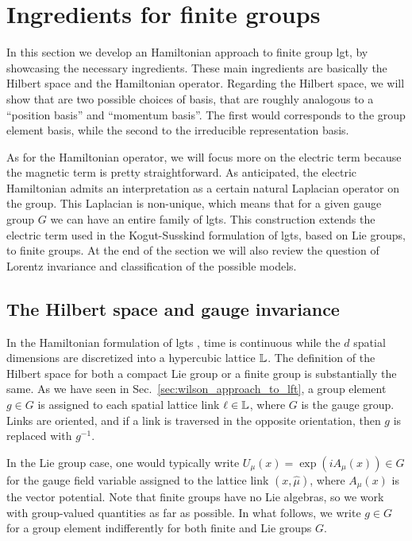 \section{Ingredients for finite groups}
\label{sec:finite_group_gauge_theory}

In this section we develop an Hamiltonian approach to finite group \ac{lgt}, by showcasing the necessary ingredients.
These main ingredients are basically the Hilbert space and the Hamiltonian operator.
Regarding the Hilbert space, we will show that are two possible choices of basis, that are roughly analogous to a ``position basis'' and ``momentum basis''.
The first would corresponds to the group element basis, while the second to the irreducible representation basis.

As for the Hamiltonian operator, we will focus more on the electric term because the magnetic term is pretty straightforward.
As anticipated, the electric Hamiltonian admits an interpretation as a certain natural Laplacian operator on the group.
This Laplacian is non-unique, which means that for a given gauge group $G$ we can have an entire family of \acp{lgt}.
This construction extends the electric term used in the Kogut-Susskind formulation \cite{kogut1975hamiltonian} of \acp{lgt}, based on Lie groups, to finite groups.
At the end of the section we will also review the question of Lorentz invariance and classification of the possible models.


\subsection{The Hilbert space and gauge invariance}%
\label{sub:the_hilbert_space}

In the Hamiltonian formulation of \acp{lgt} \cite{kogut1975hamiltonian, milstead2018qyangmills, zohar2015latticegauge}, time is continuous while the $d$ spatial dimensions are discretized into a hypercubic lattice $\mathbb{L}$.
The definition of the Hilbert space for both a compact Lie group or a finite group is substantially the same.
As we have seen in Sec.~\ref{sec:wilson_approach_to_lft}, a group element $g \in G$ is assigned to each spatial lattice link $\ell \in \mathbb{L}$, where $G$ is the gauge group.
Links are oriented, and if a link is traversed in the opposite orientation, then $g$ is replaced with $g^{-1}$.

In the Lie group case, one would typically write $U_\mu(x) = \exp{(iA_\mu(x))} \in G$ for the gauge field variable assigned to the lattice link $(x, \hat{\mu})$, where $A_\mu(x)$ is the vector potential.
Note that finite groups have no Lie algebras, so we work with group-valued quantities as far as possible.
In what follows, we write $g \in G$ for a group element indifferently for both finite and Lie groups $G$.

